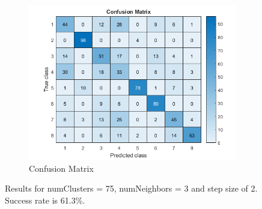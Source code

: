 \begin{figure}[h]
\begin{subfigure}{0.3\textwidth}
	\end{subfigure}
	\begin{subfigure}{0.65\textwidth}
		\includegraphics[width=\textwidth]{figures/confusion_75C_3NN_2S.png}
		\caption{Confusion Matrix}
	\end{subfigure}
	\centering
	\caption{Results for numClusters = 75, numNeighbors = 3 and step size of 2. Success rate is 61.3\%.}
	\label{fig:a5:75c3nn2s}
\end{figure}
